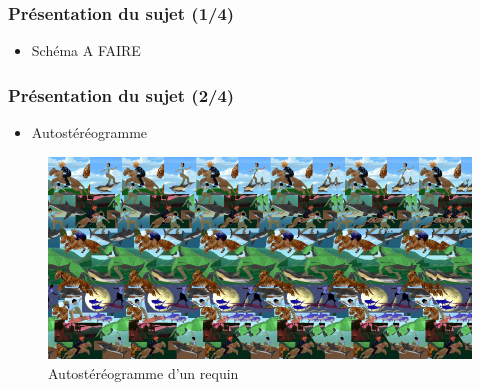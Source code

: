 \documentclass{beamer}
\begin{document}
\begin{frame}
\frametitle{Présentation du sujet (1/4)}

\begin{itemize}[label=$\bullet$]
\item Schéma A FAIRE
\end{itemize}
\end{frame}


\begin{frame}

\frametitle{Présentation du sujet (2/4)}

\begin{itemize}[label=$\bullet$]
\item Autostéréogramme
\end{itemize}
\begin{figure}
\centering
\includegraphics[scale=0.4]{autostereog.png} %
\caption{Autostéréogramme d'un requin \footnotemark}
\end{figure}

\end{frame}

\end{document}

